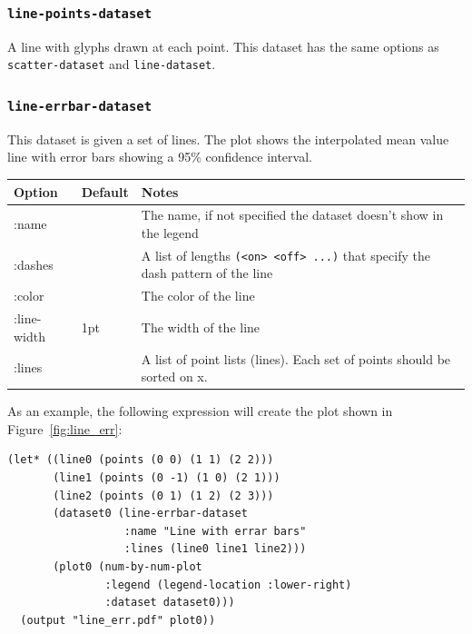 \documentclass{article}
\begin{document}
\subsubsection{\tt line-points-dataset}

A line with glyphs drawn at each point.  This dataset has the same
options as {\tt scatter-dataset} and {\tt line-dataset}.

\subsubsection{\tt line-errbar-dataset}

This dataset is given a set of lines.  The plot shows the interpolated
mean value line with error bars showing a 95\% confidence interval.

\begin{center}
\begin{tabular}{lll}
Option & Default & Notes \\
\hline
:name & & The name, if not specified the dataset doesn't show in
the legend\\
:dashes & & A list of lengths {\tt (<on> <off> ...)} that specify the
dash pattern of the line\\
:color & & The color of the line\\
:line-width & 1pt & The width of the line\\
:lines & & A list of point lists (lines).  Each set of points should
be sorted on x.\\
\end{tabular}
\end{center}

As an example, the following expression will create the plot shown in
Figure~\ref{fig:line_err}:

\begin{verbatim}
(let* ((line0 (points (0 0) (1 1) (2 2)))
       (line1 (points (0 -1) (1 0) (2 1)))
       (line2 (points (0 1) (1 2) (2 3)))
       (dataset0 (line-errbar-dataset
                  :name "Line with errar bars"
                  :lines (line0 line1 line2)))
       (plot0 (num-by-num-plot
               :legend (legend-location :lower-right)
               :dataset dataset0)))
  (output "line_err.pdf" plot0))
\end{verbatim}
\end{document}
